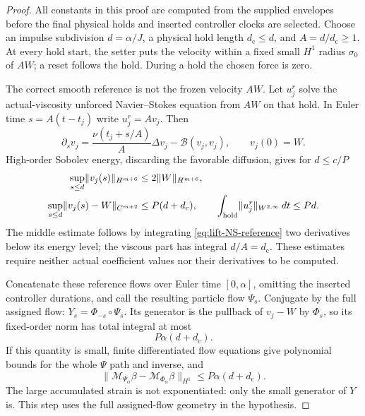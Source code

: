 \documentclass[11pt,a4paper]{amsart}
\theoremstyle{definition}
\theoremstyle{remark}
\numberwithin{equation}{section}
\newcommand{\Bcal}{\mathcal B}
\newcommand{\Mcal}{\mathcal M}
\newcommand{\norm}[1]{\lVert #1\rVert}
\begin{document}
\begin{proof}
All constants in this proof are computed from the supplied envelopes before
the final physical holds and inserted controller clocks are selected.  Choose
an impulse subdivision $d=\alpha/J$, a physical hold length $d_{\mathrm c}\le d$, and
$A=d/d_{\mathrm c}\ge1$.  At every hold start, the setter puts the velocity within a
fixed small $H^1$ radius $\sigma_0$ of $AW$; a reset follows the hold.
During a hold the chosen force is zero.

The correct smooth reference is not the frozen velocity $AW$.  Let $u_j^r$
solve the actual-viscosity unforced Navier--Stokes equation from $AW$ on
that hold.  In Euler time $s=A(t-t_j)$ write $u_j^r=Av_j$.  Then
\begin{equation}\label{eq:lift-NS-reference}
 \partial_sv_j=\frac{\nu(t_j+s/A)}{A}\Delta v_j-\Bcal(v_j,v_j),
 \qquad v_j(0)=W.
\end{equation}
High-order Sobolev energy, discarding the favorable diffusion, gives for
$d\le c/P$
\begin{align}\label{eq:lift-reference-bounds}
 \sup_{s\le d}\norm{v_j(s)}_{H^{m+6}}&\le2\norm W_{H^{m+6}},\notag\\
 \sup_{s\le d}\norm{v_j(s)-W}_{C^{m+2}}&\le P(d+d_{\mathrm c}),\qquad
 \int_{\rm hold}\norm{u_j^r}_{W^{2,\infty}}\,dt\le Pd.
\end{align}
The middle estimate follows by integrating \eqref{eq:lift-NS-reference}
two derivatives below its energy level; the viscous part has integral
$d/A=d_{\mathrm c}$.  These estimates require neither actual coefficient values nor
their derivatives to be computed.

Concatenate these reference flows over Euler time $[0,\alpha]$, omitting
the inserted controller durations, and call the resulting particle flow
$\Psi_s$.  Conjugate by the full assigned flow:
$Y_s=\Phi_{-s}\circ\Psi_s$.  Its generator is the pullback of $v_j-W$ by
$\Phi_s$, so its fixed-order norm has total integral at most
\begin{equation}\label{eq:lift-geometric-error}
 P\alpha(d+d_{\mathrm c}).
\end{equation}
If this quantity is small, finite differentiated flow equations give
polynomial bounds for the whole $\Psi$ path and inverse, and
\begin{equation}\label{eq:lift-smooth-comparison}
 \norm{\Mcal_{\Psi_\alpha}\beta-\Mcal_{\Phi_\alpha}\beta}_{H^1}
       \le P\alpha(d+d_{\mathrm c}).
\end{equation}
The large accumulated strain is not exponentiated: only the small generator
of $Y$ is.  This step uses the full assigned-flow geometry in the hypothesis.


\end{proof}
\end{document}
